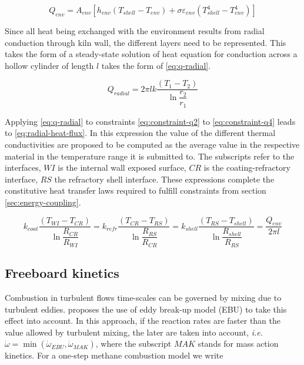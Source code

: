 \documentclass[11pt]{paper}
\begin{document}
\begin{equation}
Q_{env}=A_{env}\left[
    h_{env}(T_{shell}-T_{env})
    +\sigma{}\varepsilon_{env}(T_{shell}^4-T_{env}^4)
\right]
\label{eq:q-env}
\end{equation}

Since all heat being exchanged with the environment results from radial conduction through kiln wall, the different layers need to be represented. This takes the form of a steady-state solution of heat equation for conduction across a hollow cylinder of length $l$ takes the form of \eqref{eq:q-radial}.

\begin{equation}
Q_{radial}
=2\pi{}lk\dfrac{(T_1-T_2)}{\ln\dfrac{r_2}{r_1}}
\label{eq:q-radial}
\end{equation}

Applying \eqref{eq:q-radial} to constraints \eqref{eq:constraint-q2} to \eqref{eq:constraint-q4} leads to \eqref{eq:radial-heat-flux}. In this expression the value of the different thermal conductivities are proposed to be computed as the average value in the respective material in the temperature range it is submitted to. The subscripts refer to the interfaces, $WI$ is the internal wall exposed surface, $CR$ is the coating-refractory interface, $RS$ the refractory shell interface. These expressions complete the constitutive heat transfer laws required to fulfill constraints from section \ref{sec:energy-coupling}.

\begin{equation*}
 k_{coat} \dfrac{(T_{WI}-T_{CR})}   {\ln\dfrac{R_{CR}}   {R_{WI}}}
=k_{refr} \dfrac{(T_{CR}-T_{RS})}   {\ln\dfrac{R_{RS}}   {R_{CR}}}
=k_{shell}\dfrac{(T_{RS}-T_{shell})}{\ln\dfrac{R_{shell}}{R_{RS}}}
=\frac{Q_{env}}{2\pi{}l}
\label{eq:radial-heat-flux}
\end{equation*}

\subsection{Freeboard kinetics}

Combustion in turbulent flows time-scales can be governed by mixing due to turbulent eddies. \textcite{Mujumdar2006i} proposes the use of eddy break-up model (EBU) to take this effect into account. In this approach, if the reaction rates  are faster than the value allowed by turbulent mixing, the later are taken into account, \emph{i.e.} $\dot{\omega}=\min\left(\dot{\omega}_{EBU},\dot{\omega}_{MAK}\right)$, where the subscript $MAK$ stands for mass action kinetics. For a one-step methane combustion model  we write
\end{document}
